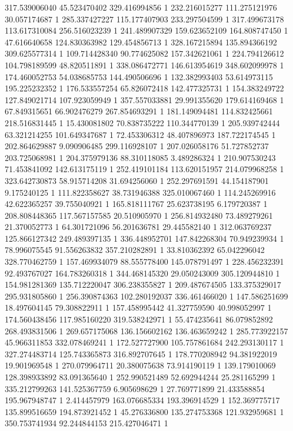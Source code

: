 317.539006040	45.523470402	329.416994856	1
232.216015277	111.275121976	30.057174687	1
285.337427227	115.177407903	233.297504599	1
317.499673178	113.617310084	256.516023239	1
241.489907329	159.623652109	164.808747450	1
47.616640658	124.830363982	129.454856713	1
328.167215894	135.894366192	309.625577314	1
109.714428340	90.774625082	157.342621061	1
224.794126612	104.798189599	48.820511891	1
338.086472771	146.613954619	348.602099978	1
174.460052753	54.038685753	144.490506696	1
132.382993403	53.614973115	195.225232352	1
176.533557254	65.826072418	142.477325731	1
154.383249722	127.849021714	107.923059949	1
357.557033881	29.991355620	179.614169468	1
67.849315651	66.902476279	267.854693291	1
181.149094481	114.832425661	218.516831445	1
15.430081802	70.838735222	110.344770139	1
205.939742444	63.321214255	101.649347687	1
72.453306312	48.407896973	187.722174545	1
202.864629887	9.090906485	299.116928107	1
207.026058176	51.727852737	203.725068981	1
204.375979136	88.310118085	3.489286324	1
210.907530243	71.453841092	142.613175119	1
252.419101184	113.620151957	214.079968258	1
323.642730873	58.915714208	31.694256060	1
252.297691591	44.154187901	9.175240125	1
111.822358627	38.731946388	325.010067460	1
114.245269916	42.622365257	39.755040921	1
165.818111767	25.623738195	6.179720387	1
208.808448365	117.567157585	20.510905970	1
256.814932480	73.489279261	21.370052773	1
64.301721096	56.201636781	29.445582140	1
312.063769237	125.866127342	249.489397135	1
336.448952701	147.842268304	70.949239934	1
78.996075545	91.556263832	357.210282891	1
33.810362392	65.042296042	328.770462759	1
157.469934079	88.555778400	145.078791497	1
228.456232391	92.493767027	164.783260318	1
344.468145320	29.050243009	305.120944810	1
154.981281369	135.712220047	306.238355827	1
209.487674505	133.375329017	295.931805860	1
256.390874363	102.280192037	336.461466020	1
147.586251699	18.497604145	79.308822911	1
157.458995442	41.327759590	40.998052997	1
174.560438456	117.985160220	319.538242971	1
55.474235641	86.079852892	268.493831506	1
269.657175068	136.156602162	136.463659242	1
285.773922157	45.966311853	332.078469241	1
172.527727900	105.757861684	242.293130117	1
327.274483714	125.743365873	316.892707645	1
178.770208942	94.381922019	19.901969548	1
270.079964711	20.380075638	73.914190119	1
139.179010069	128.398933892	83.091365640	1
252.990521489	52.692944244	25.281165299	1
335.212799263	141.525367759	6.905698629	1
27.769771899	21.433588854	195.967948747	1
2.414457979	163.076685334	193.396914529	1
152.369775717	135.899516659	194.873921452	1
45.276336800	135.274753368	121.932959681	1
350.753741934	92.244844153	215.427046471	1
